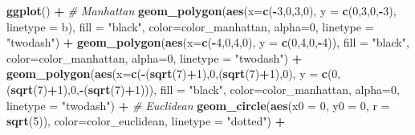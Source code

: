 \documentclass[]{article}
\newenvironment{Shaded}{\begin{snugshade}}{\end{snugshade}}
\newcommand{\CommentTok}[1]{\textcolor[rgb]{0.56,0.35,0.01}{\textit{#1}}}
\newcommand{\DataTypeTok}[1]{\textcolor[rgb]{0.13,0.29,0.53}{#1}}
\newcommand{\DecValTok}[1]{\textcolor[rgb]{0.00,0.00,0.81}{#1}}
\newcommand{\KeywordTok}[1]{\textcolor[rgb]{0.13,0.29,0.53}{\textbf{#1}}}
\newcommand{\NormalTok}[1]{#1}
\newcommand{\OperatorTok}[1]{\textcolor[rgb]{0.81,0.36,0.00}{\textbf{#1}}}
\newcommand{\StringTok}[1]{\textcolor[rgb]{0.31,0.60,0.02}{#1}}
\begin{document}
\begin{Shaded}
\begin{Highlighting}[]
\KeywordTok{ggplot}\NormalTok{() }\OperatorTok{+}
\StringTok{  }\CommentTok{# Manhattan}
\StringTok{  }\KeywordTok{geom_polygon}\NormalTok{(}\KeywordTok{aes}\NormalTok{(}\DataTypeTok{x=}\KeywordTok{c}\NormalTok{(}\OperatorTok{-}\DecValTok{3}\NormalTok{,}\DecValTok{0}\NormalTok{,}\DecValTok{3}\NormalTok{,}\DecValTok{0}\NormalTok{), }\DataTypeTok{y =} \KeywordTok{c}\NormalTok{(}\DecValTok{0}\NormalTok{,}\DecValTok{3}\NormalTok{,}\DecValTok{0}\NormalTok{,}\OperatorTok{-}\DecValTok{3}\NormalTok{), }\DataTypeTok{linetype =}\NormalTok{ b), }\DataTypeTok{fill =} \StringTok{"black"}\NormalTok{, }\DataTypeTok{color=}\NormalTok{color_manhattan, }\DataTypeTok{alpha=}\DecValTok{0}\NormalTok{, }\DataTypeTok{linetype =} \StringTok{"twodash"}\NormalTok{) }\OperatorTok{+}
\StringTok{  }\KeywordTok{geom_polygon}\NormalTok{(}\KeywordTok{aes}\NormalTok{(}\DataTypeTok{x=}\KeywordTok{c}\NormalTok{(}\OperatorTok{-}\DecValTok{4}\NormalTok{,}\DecValTok{0}\NormalTok{,}\DecValTok{4}\NormalTok{,}\DecValTok{0}\NormalTok{), }\DataTypeTok{y =} \KeywordTok{c}\NormalTok{(}\DecValTok{0}\NormalTok{,}\DecValTok{4}\NormalTok{,}\DecValTok{0}\NormalTok{,}\OperatorTok{-}\DecValTok{4}\NormalTok{)), }\DataTypeTok{fill =} \StringTok{"black"}\NormalTok{, }\DataTypeTok{color=}\NormalTok{color_manhattan, }\DataTypeTok{alpha=}\DecValTok{0}\NormalTok{, }\DataTypeTok{linetype =} \StringTok{"twodash"}\NormalTok{) }\OperatorTok{+}
\StringTok{  }\KeywordTok{geom_polygon}\NormalTok{(}\KeywordTok{aes}\NormalTok{(}\DataTypeTok{x=}\KeywordTok{c}\NormalTok{(}\OperatorTok{-}\NormalTok{(}\KeywordTok{sqrt}\NormalTok{(}\DecValTok{7}\NormalTok{)}\OperatorTok{+}\DecValTok{1}\NormalTok{),}\DecValTok{0}\NormalTok{,(}\KeywordTok{sqrt}\NormalTok{(}\DecValTok{7}\NormalTok{)}\OperatorTok{+}\DecValTok{1}\NormalTok{),}\DecValTok{0}\NormalTok{), }\DataTypeTok{y =} \KeywordTok{c}\NormalTok{(}\DecValTok{0}\NormalTok{,(}\KeywordTok{sqrt}\NormalTok{(}\DecValTok{7}\NormalTok{)}\OperatorTok{+}\DecValTok{1}\NormalTok{),}\DecValTok{0}\NormalTok{,}\OperatorTok{-}\NormalTok{(}\KeywordTok{sqrt}\NormalTok{(}\DecValTok{7}\NormalTok{)}\OperatorTok{+}\DecValTok{1}\NormalTok{))), }\DataTypeTok{fill =} \StringTok{"black"}\NormalTok{, }\DataTypeTok{color=}\NormalTok{color_manhattan, }\DataTypeTok{alpha=}\DecValTok{0}\NormalTok{, }\DataTypeTok{linetype =} \StringTok{"twodash"}\NormalTok{) }\OperatorTok{+}
\StringTok{ }\CommentTok{# Euclidean}
\StringTok{  }\KeywordTok{geom_circle}\NormalTok{(}\KeywordTok{aes}\NormalTok{(}\DataTypeTok{x0 =} \DecValTok{0}\NormalTok{, }\DataTypeTok{y0 =} \DecValTok{0}\NormalTok{, }\DataTypeTok{r =} \KeywordTok{sqrt}\NormalTok{(}\DecValTok{5}\NormalTok{)),  }\DataTypeTok{color=}\NormalTok{color_euclidean, }\DataTypeTok{linetype =} \StringTok{"dotted"}\NormalTok{) }\OperatorTok{+}

\end{Highlighting}
\end{Shaded}
\end{document}
